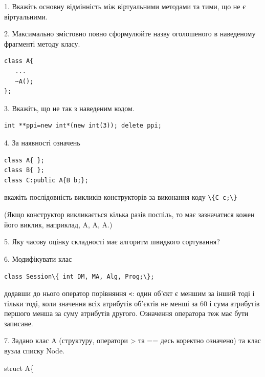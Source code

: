 \documentclass[12pt, ukrainian]{article}
\def\code#1{\Verb!#1!}
\begin{document}
{%
1. Вкажіть основну відмінність між віртуальними методами та тими, що не є віртуальними.%
\par
\vspace{2mm}
2. Максимально змістовно повно сформулюйте назву оголошеного в наведеному фрагменті методу класу.
\vspace{-3mm}
\begin{verbatim}class A{
   ...
   ~A();
};\end{verbatim}
\vspace{-3mm}
\par
\vspace{2mm}
3. Вкажіть, що не так з наведеним кодом.
\vspace{-3mm}
\begin{verbatim}int **ppi=new int*(new int(3)); delete ppi;\end{verbatim}
\vspace{-3mm}
\par
\vspace{2mm}
4. За наявності означень
\vspace{-3mm}
\begin{verbatim}
class A{ };
class B{ };
class C:public A{B b;};\end{verbatim}
\vspace{-3mm}
вкажіть послідовність викликів конструкторів за виконання коду \code{\{C c;\}} 

(Якщо конструктор викликається кілька разів поспіль, то має зазначатися кожен його виклик, наприклад, A, A, A.)

\vspace{2mm}
5. Яку часову оцінку складності має алгоритм швидкого сортування?
\par
\vspace{2mm}
6. Модифікувати клас 

\qquad\code{class Session\{ int DM, MA, Alg, Prog;\};} 


додавши до нього оператор порівняння \code{<}: один об'єкт є меншим за інший тоді і тільки тоді, коли значення всіх атрибутів об'єктів не менші за 60 і сума атрибутів першого менша за суму атрибутів другого. Означення оператора теж має бути записане.%
\par
\vspace{2mm}
7. 
Задано клас A (структуру, оператори > та == десь коректно означено) та клас вузла списку Node.

struct A\{

}
\end{document}
